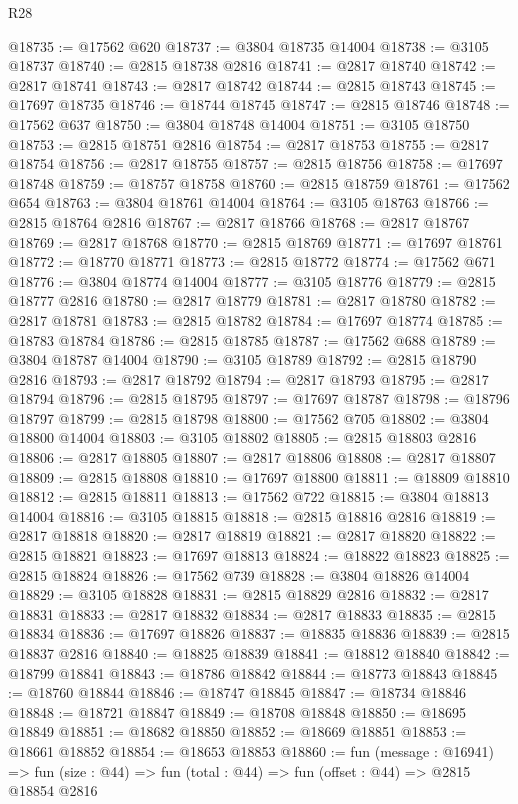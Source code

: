 \begin{lexlean}{R28}
\begin{coremodule}
@18735 := @17562 @620
@18737 := @3804 @18735 @14004
@18738 := @3105 @18737
@18740 := @2815 @18738 @2816
@18741 := @2817 @18740
@18742 := @2817 @18741
@18743 := @2817 @18742
@18744 := @2815 @18743
@18745 := @17697 @18735
@18746 := @18744 @18745
@18747 := @2815 @18746
@18748 := @17562 @637
@18750 := @3804 @18748 @14004
@18751 := @3105 @18750
@18753 := @2815 @18751 @2816
@18754 := @2817 @18753
@18755 := @2817 @18754
@18756 := @2817 @18755
@18757 := @2815 @18756
@18758 := @17697 @18748
@18759 := @18757 @18758
@18760 := @2815 @18759
@18761 := @17562 @654
@18763 := @3804 @18761 @14004
@18764 := @3105 @18763
@18766 := @2815 @18764 @2816
@18767 := @2817 @18766
@18768 := @2817 @18767
@18769 := @2817 @18768
@18770 := @2815 @18769
@18771 := @17697 @18761
@18772 := @18770 @18771
@18773 := @2815 @18772
@18774 := @17562 @671
@18776 := @3804 @18774 @14004
@18777 := @3105 @18776
@18779 := @2815 @18777 @2816
@18780 := @2817 @18779
@18781 := @2817 @18780
@18782 := @2817 @18781
@18783 := @2815 @18782
@18784 := @17697 @18774
@18785 := @18783 @18784
@18786 := @2815 @18785
@18787 := @17562 @688
@18789 := @3804 @18787 @14004
@18790 := @3105 @18789
@18792 := @2815 @18790 @2816
@18793 := @2817 @18792
@18794 := @2817 @18793
@18795 := @2817 @18794
@18796 := @2815 @18795
@18797 := @17697 @18787
@18798 := @18796 @18797
@18799 := @2815 @18798
@18800 := @17562 @705
@18802 := @3804 @18800 @14004
@18803 := @3105 @18802
@18805 := @2815 @18803 @2816
@18806 := @2817 @18805
@18807 := @2817 @18806
@18808 := @2817 @18807
@18809 := @2815 @18808
@18810 := @17697 @18800
@18811 := @18809 @18810
@18812 := @2815 @18811
@18813 := @17562 @722
@18815 := @3804 @18813 @14004
@18816 := @3105 @18815
@18818 := @2815 @18816 @2816
@18819 := @2817 @18818
@18820 := @2817 @18819
@18821 := @2817 @18820
@18822 := @2815 @18821
@18823 := @17697 @18813
@18824 := @18822 @18823
@18825 := @2815 @18824
@18826 := @17562 @739
@18828 := @3804 @18826 @14004
@18829 := @3105 @18828
@18831 := @2815 @18829 @2816
@18832 := @2817 @18831
@18833 := @2817 @18832
@18834 := @2817 @18833
@18835 := @2815 @18834
@18836 := @17697 @18826
@18837 := @18835 @18836
@18839 := @2815 @18837 @2816
@18840 := @18825 @18839
@18841 := @18812 @18840
@18842 := @18799 @18841
@18843 := @18786 @18842
@18844 := @18773 @18843
@18845 := @18760 @18844
@18846 := @18747 @18845
@18847 := @18734 @18846
@18848 := @18721 @18847
@18849 := @18708 @18848
@18850 := @18695 @18849
@18851 := @18682 @18850
@18852 := @18669 @18851
@18853 := @18661 @18852
@18854 := @18653 @18853
@18860 := fun (message : @16941) =>
  fun (size : @44) => fun (total : @44) => fun (offset : @44) => @2815 @18854 @2816

\end{coremodule}
\end{lexlean}
